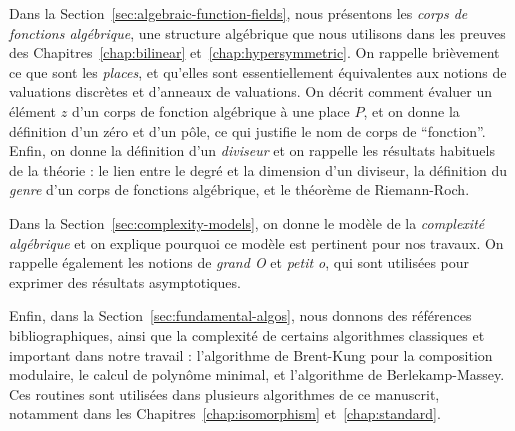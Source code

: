 Dans la Section~\ref{sec:algebraic-function-fields}, nous présentons les
\emph{corps de
fonctions algébrique}, une structure algébrique que nous utilisons dans les
preuves des Chapitres~\ref{chap:bilinear} et~\ref{chap:hypersymmetric}. On
rappelle brièvement ce que sont les \emph{places}, et qu'elles sont
essentiellement équivalentes aux notions de valuations discrètes et d'anneaux de
valuations. On décrit comment évaluer un élément $z$ d'un corps de fonction
algébrique à une place $P$, et on donne la définition d'un zéro et d'un pôle, ce
qui justifie le nom de corps de ``fonction''. Enfin, on donne la définition d'un
\emph{diviseur} et on rappelle les résultats habituels de la théorie : le lien
entre le degré et la dimension d'un diviseur, la définition du \emph{genre} d'un
corps de fonctions algébrique, et le théorème de Riemann-Roch.

Dans la Section~\ref{sec:complexity-models}, on donne le modèle de la
\emph{complexité algébrique} et on explique pourquoi ce modèle est pertinent
pour nos travaux. On rappelle également les notions de \emph{grand O} et
\emph{petit o}, qui sont utilisées pour exprimer des résultats asymptotiques.

Enfin, dans la Section~\ref{sec:fundamental-algos}, nous donnons des références
bibliographiques, ainsi que la complexité de certains algorithmes classiques et
important dans notre travail : l'algorithme de Brent-Kung pour la composition
modulaire, le calcul de polynôme minimal, et l'algorithme de Berlekamp-Massey.
Ces routines sont utilisées dans plusieurs algorithmes de ce manuscrit, notamment
dans les Chapitres~\ref{chap:isomorphism} et~\ref{chap:standard}.


